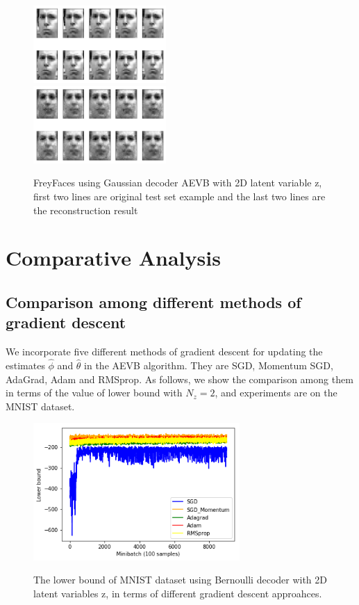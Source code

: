 \documentclass[11pt]{article}
\begin{document}
\begin{figure}[H]
\begin{center}
\includegraphics[width = 0.45\textwidth]{fig/f_test1}\\
\vspace{5mm}
\includegraphics[width = 0.45\textwidth]{fig/f_new1}\\
\caption{FreyFaces using Gaussian decoder AEVB with 2D latent variable z, first two lines are original test set example and the last two lines are the reconstruction result} \label{fig:FreyFaces-reconst}
\end{center}
\end{figure}

\section{Comparative Analysis}
\subsection{Comparison among different methods of gradient descent}
We incorporate five different methods of gradient descent for updating the estimates $\hat{\phi}$ and $\hat{\theta}$ in the AEVB algorithm. They are SGD, Momentum SGD, AdaGrad, Adam and RMSprop. As follows, we show the comparison among them in terms of the value of lower bound with $N_z =2 $, and experiments are on the MNIST dataset.

\begin{figure}[H]
\begin{center}
\includegraphics[width = 0.7\textwidth]{fig/gradient_compare}\\
\caption{The lower bound of MNIST dataset using Bernoulli decoder with 2D latent variables z, in terms of different gradient descent approahces.}
\end{center}
\end{figure}
\end{document}
